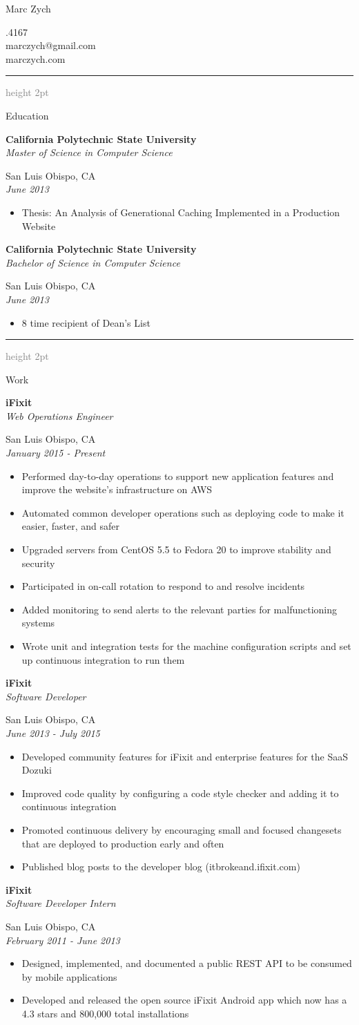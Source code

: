 \documentclass[letterpaper,11pt]{article}
\newcommand{\resauthor}[4]{
   \begin{minipage}[c]{.4\textwidth}
      \raggedright
      {\Huge #1}
   \end{minipage}
   \hfill
   \begin{minipage}[c]{.4\textwidth}
      \raggedleft
      #2\\
      #3\\
      #4
   \end{minipage}
}
\newcommand{\ressectiondivider}{
   \vspace{5pt}
   \textcolor{gray}{\hrule height 2pt}
   \vspace{2.5pt}
}
\newcommand{\resitem}[1]{\item #1 \vspace{-2pt}}
\newcommand{\ressubheading}[4]{
   \begin{minipage}[t]{10cm}
      \flushleft
      \textbf{#1}\\
      \textit{#3}\\
   \end{minipage}
   \hfill
   \begin{minipage}[t]{5cm}
      \flushright
      #2\\
      \textit{#4}\\
   \end{minipage}
}
\newenvironment{ressection}[1]{
   \ressectiondivider
   \begin{minipage}[t]{2.5cm}
      \flushleft
      {\Large #1}
   \end{minipage}
   \hfill
   \begin{minipage}[t]{16cm}
      \flushleft
}{
   \end{minipage}
}
\begin{document}
\resauthor{Marc Zych}{805.217.4167}{marczych@gmail.com}{marczych.com}

\vspace{20pt}

\begin{ressection}{Education}
   \ressubheading{California Polytechnic State University}{San Luis Obispo, CA}{Master of Science in Computer Science}{June 2013}
   \begin{itemize}
      \resitem{Thesis: An Analysis of Generational Caching Implemented in a Production Website}
   \end{itemize}
   \ressubheading{California Polytechnic State University}{San Luis Obispo, CA}{Bachelor of Science in Computer Science}{June 2013}
   \begin{itemize}
      \resitem{8 time recipient of Dean's List}
   \end{itemize}
\end{ressection}

\begin{ressection}{Work}
   \ressubheading{iFixit}{San Luis Obispo, CA}{Web Operations Engineer}{January 2015 - Present}
   \begin{itemize}
      \resitem{Performed day-to-day operations to support new application features and improve the website's infrastructure on AWS}
      \resitem{Automated common developer operations such as deploying code to make it easier, faster, and safer}
      \resitem{Upgraded servers from CentOS 5.5 to Fedora 20 to improve stability and security}
      \resitem{Participated in on-call rotation to respond to and resolve incidents}
      \resitem{Added monitoring to send alerts to the relevant parties for malfunctioning systems}
      \resitem{Wrote unit and integration tests for the machine configuration scripts and set up continuous integration to run them}
   \end{itemize}
   \ressubheading{iFixit}{San Luis Obispo, CA}{Software Developer}{June 2013 - July 2015}
   \begin{itemize}
      \resitem{Developed community features for iFixit and enterprise features for the SaaS Dozuki}
      \resitem{Improved code quality by configuring a code style checker and adding it to continuous integration}
      \resitem{Promoted continuous delivery by encouraging small and focused changesets that are deployed to production early and often}
      \resitem{Published blog posts to the developer blog (itbrokeand.ifixit.com)}
   \end{itemize}
   \ressubheading{iFixit}{San Luis Obispo, CA}{Software Developer Intern}{February 2011 - June 2013}
   \begin{itemize}
      \resitem{Designed, implemented, and documented a public REST API to be consumed by mobile applications}
      \resitem{Developed and released the open source iFixit Android app which now has a 4.3 stars and 800,000 total installations}
   \end{itemize}
\end{ressection}
\end{document}
